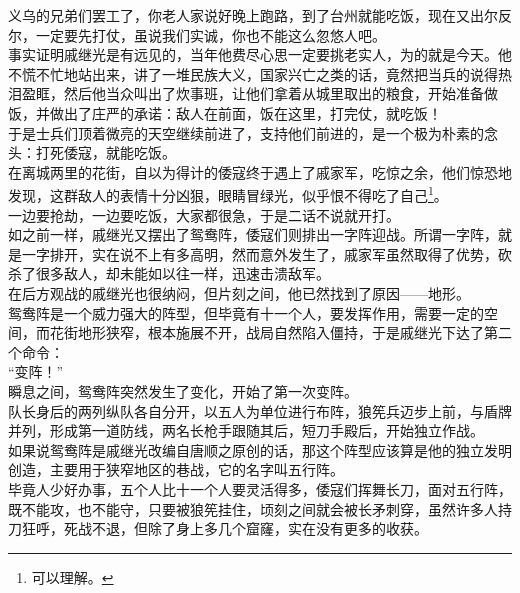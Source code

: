 \begin{multicols}{\theparacolNo}
义乌的兄弟们罢工了，你老人家说好晚上跑路，到了台州就能吃饭，现在又出尔反尔，一定要先打仗，虽说我们实诚，你也不能这么忽悠人吧。\\

事实证明戚继光是有远见的，当年他费尽心思一定要挑老实人，为的就是今天。他不慌不忙地站出来，讲了一堆民族大义，国家兴亡之类的话，竟然把当兵的说得热泪盈眶，然后他当众叫出了炊事班，让他们拿着从城里取出的粮食，开始准备做饭，并做出了庄严的承诺：敌人在前面，饭在这里，打完仗，就吃饭！\\

于是士兵们顶着微亮的天空继续前进了，支持他们前进的，是一个极为朴素的念头：打死倭寇，就能吃饭。\\

在离城两里的花街，自以为得计的倭寇终于遇上了戚家军，吃惊之余，他们惊恐地发现，这群敌人的表情十分凶狠，眼睛冒绿光，似乎恨不得吃了自己\footnote{可以理解。}。\\

一边要抢劫，一边要吃饭，大家都很急，于是二话不说就开打。\\

如之前一样，戚继光又摆出了鸳鸯阵，倭寇们则排出一字阵迎战。所谓一字阵，就是一字排开，实在说不上有多高明，然而意外发生了，戚家军虽然取得了优势，砍杀了很多敌人，却未能如以往一样，迅速击溃敌军。\\

在后方观战的戚继光也很纳闷，但片刻之间，他已然找到了原因——地形。\\

鸳鸯阵是一个威力强大的阵型，但毕竟有十一个人，要发挥作用，需要一定的空间，而花街地形狭窄，根本施展不开，战局自然陷入僵持，于是戚继光下达了第二个命令：\\

“变阵！”\\

瞬息之间，鸳鸯阵突然发生了变化，开始了第一次变阵。\\

队长身后的两列纵队各自分开，以五人为单位进行布阵，狼筅兵迈步上前，与盾牌并列，形成第一道防线，两名长枪手跟随其后，短刀手殿后，开始独立作战。\\

如果说鸳鸯阵是戚继光改编自唐顺之原创的话，那这个阵型应该算是他的独立发明创造，主要用于狭窄地区的巷战，它的名字叫五行阵。\\

毕竟人少好办事，五个人比十一个人要灵活得多，倭寇们挥舞长刀，面对五行阵，既不能攻，也不能守，只要被狼筅挂住，顷刻之间就会被长矛刺穿，虽然许多人持刀狂呼，死战不退，但除了身上多几个窟窿，实在没有更多的收获。\\


\end{multicols}
